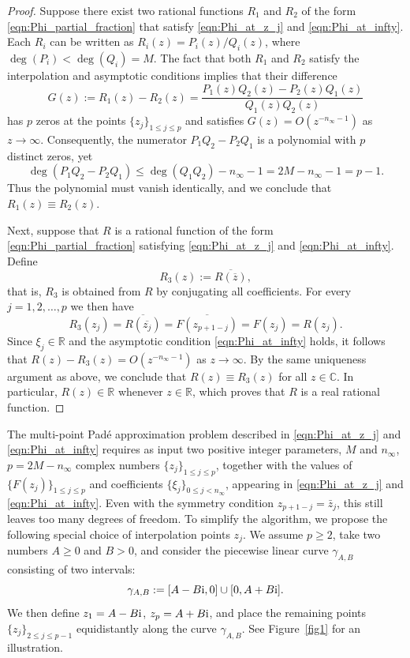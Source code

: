 \documentclass[12pt]{article}
\def\r{{\mathbb R}}
\def\c{{\mathbb C}}
\def\i{{\textnormal i}}
\begin{document}
\begin{proof}
Suppose there exist two rational functions $R_1$ and $R_2$ of the form \eqref{eqn:Phi_partial_fraction} that satisfy \eqref{eqn:Phi_at_z_j} and \eqref{eqn:Phi_at_infty}. Each $R_i$ can be written as $R_i(z)=P_i(z)/Q_i(z)$, where $\deg(P_i)<\deg(Q_i)=M$. The fact that both $R_1$ and $R_2$ satisfy the interpolation and asymptotic conditions implies that their difference
\[
G(z):=R_1(z)-R_2(z) = \frac{P_1(z)Q_2(z)-P_2(z)Q_1(z)}{Q_1(z)Q_2(z)}
\]
has $p$ zeros at the points $\{z_j\}_{1 \le j \le p}$ and satisfies $G(z)=O(z^{-n_{\infty}-1})$ as $z\to\infty$. Consequently, the numerator $P_1Q_2-P_2Q_1$ is a polynomial with $p$ distinct zeros, yet
\[
\deg(P_1Q_2-P_2Q_1) \le \deg(Q_1Q_2)-n_{\infty}-1 = 2M-n_{\infty}-1=p-1.
\]
Thus the polynomial must vanish identically, and we conclude that $R_1(z)\equiv R_2(z)$.  

Next, suppose that $R$ is a rational function of the form \eqref{eqn:Phi_partial_fraction} satisfying \eqref{eqn:Phi_at_z_j} and \eqref{eqn:Phi_at_infty}. Define
\[
R_3(z) := \overline{R(\overline{z})},
\]
that is, $R_3$ is obtained from $R$ by conjugating all coefficients. For every $j=1,2,\dots,p$ we then have
\[
R_3(z_j) = \overline{R(\overline{z_j})}
= \overline{F(z_{p+1-j})} = F(z_j) = R(z_j).
\]
Since $\xi_j\in \r$ and the asymptotic condition \eqref{eqn:Phi_at_infty} holds, it follows that $R(z)-R_3(z)=O(z^{-n_{\infty}-1})$ as $z\to\infty$. By the same uniqueness argument as above, we conclude that $R(z)\equiv R_3(z)$ for all $z\in \c$. In particular, $R(z)\in \r$ whenever $z\in \r$, which proves that $R$ is a real rational function.
\end{proof}


The multi-point Pad\'e approximation problem described in \eqref{eqn:Phi_at_z_j} and \eqref{eqn:Phi_at_infty} requires as input two positive integer parameters, $M$ and $n_{\infty}$, $p=2M-n_{\infty}$ complex numbers $\{z_j\}_{1\le j \le p}$, together with the
values of $\{F(z_j)\}_{1\le j\le p}$ and coefficients $\{\xi_j\}_{0\le j < n_{\infty}}$, appearing in \eqref{eqn:Phi_at_z_j} and \eqref{eqn:Phi_at_infty}. Even with the symmetry condition $z_{p+1-j}=\bar z_j$, this still leaves too many degrees of freedom. To simplify the algorithm, we propose the following special choice of interpolation points $z_j$.  We assume $p \ge 2$, take two numbers $A\ge 0$ and $B>0$, and consider the piecewise linear curve $\gamma_{A,B}$ consisting of two intervals:
\[
\gamma_{A,B}:=[A-B \i , 0] \cup [0, A+B \i].
\]
We then define $z_1=A-B\i$, $z_p=A+B\i$, and place the remaining points $\{z_j\}_{2 \le j \le p-1}$ equidistantly along the curve $\gamma_{A,B}$. See Figure~\ref{fig1} for an illustration.  
\end{document}
